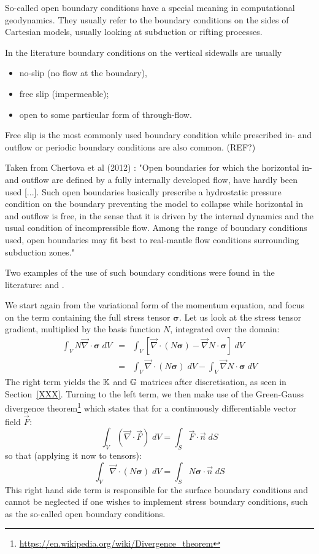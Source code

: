 So-called open boundary conditions have a special meaning in computational geodynamics. 
They usually refer to the boundary conditions on the sides of Cartesian models, 
usually looking at subduction or rifting processes. 

In the literature boundary conditions on the vertical sidewalls are usually 
\begin{itemize}
\item no-slip (no flow at the boundary), 
\item free slip (impermeable); 
\item open to some particular form of through-flow.
\end{itemize}

Free slip is the most commonly used boundary condition while prescribed in- and outflow 
or periodic boundary conditions are also common. (REF?)

Taken from Chertova et al (2012) \cite{chgv12}:
"Open boundaries for which the horizontal in- and outflow are defined by a fully 
internally developed flow, have hardly been used [...]. 
Such open boundaries basically prescribe a hydrostatic pressure condition on 
the boundary preventing the model to collapse while horizontal in and outflow is free, 
in the sense that it is driven by the internal dynamics and the usual condition of 
incompressible flow. 
Among the range of boundary conditions used, open boundaries may fit best to 
real-mantle flow conditions surrounding subduction zones." 

Two examples of the use of such boundary conditions were found in 
the literature: \cite{qusp10} and \cite{chgv12}.

We start again from the variational form of the momentum equation, and focus on the term containing 
the full stress tensor ${\bm \sigma}$. 
Let us look at the stress tensor gradient, multiplied by the basis function $N$, integrated over the domain:
\begin{eqnarray}
\int_V N {\vec \nabla}\cdot {\bm \sigma} \; dV 
&=&\int_V \left[ {\vec \nabla}\cdot(N {\bm \sigma}) -{\vec \nabla}N \cdot {\bm \sigma}\right] \; dV \nonumber\\
&=& \int_V  {\vec \nabla}\cdot(N {\bm \sigma})\;  dV -\int_V  {\vec \nabla}N \cdot {\bm \sigma} \; dV
\end{eqnarray}
The right term yields the ${\mathbb{K}}$ and ${\mathbb{G}}$ matrices after discretisation, as seen in Section~\ref{XXX}.
Turning to the left term, we then make use of the Green-Gauss divergence 
theorem\footnote{\url{https://en.wikipedia.org/wiki/Divergence_theorem}} which states that for 
a continuously differentiable vector field $\vec{F}$:
\[
\int_V ({\vec \nabla} \cdot {\vec F})\; dV = \int _S {\vec F}\cdot {\vec n} \; dS
\]
so that (applying it now to tensors):
\[
\int_V  {\vec \nabla}\cdot(N {\bm \sigma})\;  dV =\int_S  N {\bm \sigma} \cdot {\vec n} \;  dS
\]
This right hand side term is responsible for the surface 
boundary conditions and cannot be neglected if one 
wishes to implement stress boundary conditions, 
such as the so-called open boundary conditions. 

